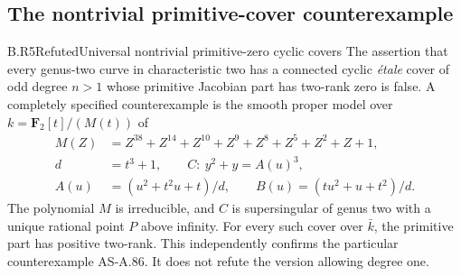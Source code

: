 \subsection{The nontrivial primitive-cover counterexample}

\begin{claim}{B.R5}{Refuted}{Universal nontrivial primitive-zero cyclic covers}
The assertion that every genus-two curve in characteristic two has
a connected cyclic \emph{\'etale} cover of odd degree $n>1$ whose
primitive Jacobian part has two-rank zero is false. A completely
specified counterexample is the smooth proper model over
$k=\mathbf F_2[t]/(M(t))$ of
\[
\begin{split}
 M(Z)&=Z^{38}+Z^{14}+Z^{10}+Z^9+Z^8+Z^5+Z^2+Z+1,\\
 d&=t^3+1,\qquad
 C:\ y^2+y=A(u)^3,\\
 A(u)&=(u^2+t^2u+t)/d,\qquad
 B(u)=(tu^2+u+t^2)/d .
\end{split}
\]
The polynomial $M$ is irreducible, and $C$ is supersingular of
genus two with a unique rational point $P$ above infinity.
For every such cover over $\bar k$, the primitive part has positive
two-rank. This independently confirms the particular counterexample
AS-A.86. It does not refute the version allowing degree one.
\end{claim}
